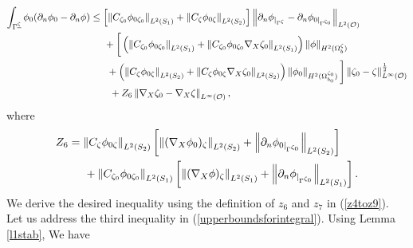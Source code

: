 \documentclass[11pt]{article}
\begin{document}
\begin{equation*}
	\begin{split}
		\displaystyle\int_{\Gamma^{\underline{\zeta}}} \phi_0(\partial_n\phi_0-\partial_n\phi)&\leq\left[\left\Vert C_{\zeta_0}\phi_{0\zeta_0}\right\Vert_{L^2(S_1)}+\left\Vert C_{\zeta}\phi_{0\zeta}\right\Vert_{L^2(S_2)}\right] \left\Vert\partial_n\phi_{|_{\Gamma^{\zeta}}}-\partial_n\phi_{0|_{\Gamma^{\zeta_0}}}\right\Vert_{L^2(\mathcal O )}\\
		&\hspace{0.5cm}+\bigg[  \left(  \left\Vert C_{\zeta_0}\phi_{0\zeta_0} \right\Vert_{L^2(S_1)}+ \left\Vert  C_{\zeta_0}\phi_{0\zeta_0}\nabla_X\zeta_0\right\Vert_{L^2(S_1)} \right)\left\Vert \phi  \right\Vert_{H^2(\Omega_b^{\zeta})}  \\
		&\hspace{0.6cm}+   \left(  \left\Vert C_{\zeta}\phi_{0\zeta} \right\Vert_{L^2(S_2)}+ \left\Vert C_{\zeta} \phi_{0\zeta}\nabla_X\zeta_0\right\Vert_{L^2(S_2)} \right)\left\Vert \phi_0  \right\Vert_{H^2(\Omega_{b_0}^{\zeta_0})}      \bigg]\left\Vert   \zeta_0-\zeta\right\Vert_{L^{\infty}(\mathcal O )}^{\frac{1}{2}}\\
		&\hspace{0.7cm}+Z_6\left\Vert\nabla_X\zeta_0-\nabla_X\zeta  \right\Vert_{L^{\infty}(\mathcal O )},
	\end{split}
\end{equation*}
where
\begin{equation*}
	\begin{split}
		Z_6&=\left\Vert C_{\zeta}\phi_{0\zeta} \right\Vert_{L^2(S_2)}\left[  \left\Vert  (\nabla_X\phi_0)_{\zeta}\right\Vert_{L^2(S_2)}+ \left\Vert \partial_n\phi_{0|_{\Gamma^{\zeta_0}}} \right\Vert_{L^2(S_2)} \right]\\
		&\hspace{0.5cm}+\left\Vert C_{\zeta_0}\phi_{0\zeta_0} \right\Vert_{L^2(S_1)}\left[  \left\Vert  (\nabla_X\phi)_{\zeta}\right\Vert_{L^2(S_1)}+ \left\Vert \partial_n\phi_{|_{\Gamma^{\zeta_0}}} \right\Vert_{L^2(S_1)} \right].
	\end{split}
\end{equation*}
We derive the desired inequality using the definition of $z_6$ and $z_7$ in (\ref{z4toz9}).\\
Let us address the third inequality in  (\ref{upperboundsforintegral}). Using Lemma \ref{l1stab}, We have
\end{document}
